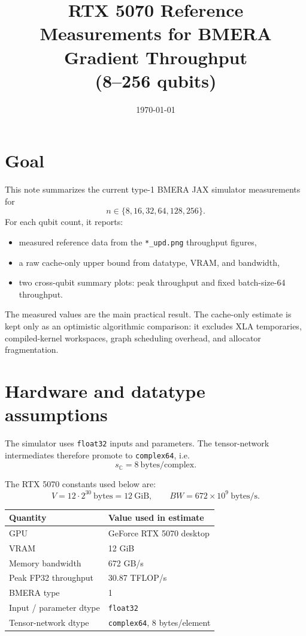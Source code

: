 \documentclass[11pt]{article}
\title{RTX 5070 Reference Measurements for BMERA Gradient Throughput\\(8--256 qubits)}
\author{}
\date{\today}
\begin{document}
\maketitle

\section*{Goal}

This note summarizes the current type-1 BMERA JAX simulator measurements for
\[
  n \in \{8,16,32,64,128,256\}.
\]
For each qubit count, it reports:
\begin{itemize}
  \item measured reference data from the \texttt{*\_upd.png} throughput figures,
  \item a raw cache-only upper bound from datatype, VRAM, and bandwidth,
  \item two cross-qubit summary plots: peak throughput and fixed batch-size-64 throughput.
\end{itemize}

The measured values are the main practical result. The cache-only estimate is
kept only as an optimistic algorithmic comparison: it excludes XLA temporaries,
compiled-kernel workspaces, graph scheduling overhead, and allocator
fragmentation.

\section*{Hardware and datatype assumptions}

The simulator uses \texttt{float32} inputs and parameters. The tensor-network
intermediates therefore promote to \texttt{complex64}, i.e.
\[
  s_{\mathbb{C}} = 8\ \mathrm{bytes/complex}.
\]

The RTX 5070 constants used below are:
\[
  V = 12 \cdot 2^{30}\ \mathrm{bytes} = 12\ \mathrm{GiB},
  \qquad
  BW = 672 \times 10^9\ \mathrm{bytes/s}.
\]

\begin{table}[H]
\centering
\begin{tabular}{ll}
\toprule
Quantity & Value used in estimate \\
\midrule
GPU & GeForce RTX 5070 desktop \\
VRAM & 12 GiB \\
Memory bandwidth & 672 GB/s \\
Peak FP32 throughput & 30.87 TFLOP/s \\
BMERA type & 1 \\
Input / parameter dtype & \texttt{float32} \\
Tensor-network dtype & \texttt{complex64}, 8 bytes/element \\
\bottomrule
\end{tabular}
\end{table}
\end{document}
